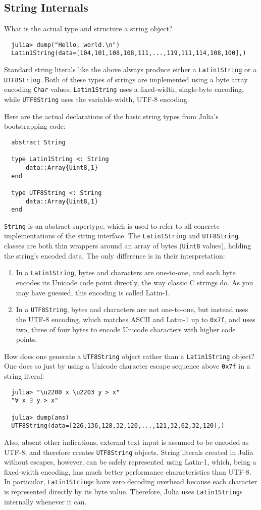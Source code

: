 \documentclass{article}
\begin{document}
\subsection{String Internals}

What is the actual type and structure a string object?
\begin{verbatim}
  julia> dump("Hello, world.\n")
  Latin1String(data=[104,101,108,108,111,...,119,111,114,108,100],)
\end{verbatim}
Standard string literals like the above always produce either a \verb|Latin1String| or a \verb|UTF8String|.
Both of these types of strings are implemented using a byte array encoding \verb|Char| values.
\verb|Latin1String| uses a fixed-width, single-byte encoding, while \verb|UTF8String| uses the variable-width, UTF-8 encoding.

Here are the actual declarations of the basic string types from Julia's bootstrapping code:
\begin{verbatim}
  abstract String

  type Latin1String <: String
      data::Array{Uint8,1}
  end

  type UTF8String <: String
      data::Array{Uint8,1}
  end
\end{verbatim}
\verb|String| is an abstract supertype, which is used to refer to all concrete implementations of the string interface.
The \verb|Latin1String| and \verb|UTF8String| classes are both thin wrappers around an array of bytes (\verb|Uint8| values), holding the string's encoded data.
The only difference is in their interpretation:
\begin{enumerate}
\item In a \verb|Latin1String|, bytes and characters are one-to-one, and each byte encodes its Unicode code point directly, the way classic C strings do.
As you may have guessed, this encoding is called Latin-1.
\item In a \verb|UTF8String|, bytes and characters are not one-to-one, but instead uses the UTF-8 encoding, which matches ASCII and Latin-1 up to \verb|0x7f|, and uses two, three of four bytes to encode Unicode characters with higher code points.
\end{enumerate}
How does one generate a \verb|UTF8String| object rather than a \verb|Latin1String| object?
One does so just by using a Unicode character escape sequence above \verb|0x7f| in a string literal:
\begin{verbatim}
  julia> "\u2200 x \u2203 y > x"
  "∀ x ∃ y > x"

  julia> dump(ans)
  UTF8String(data=[226,136,128,32,120,...,121,32,62,32,120],)
\end{verbatim}
Also, absent other indications, external text input is assumed to be encoded as UTF-8, and therefore creates \verb|UTF8String| objects.
String literals created in Julia without escapes, however, can be safely represented using Latin-1, which, being a fixed-width encoding, has much better performance characteristics than UTF-8.
In particular, \verb|Latin1String|s have zero decoding overhead because each character is represented directly by its byte value.
Therefore, Julia uses \verb|Latin1String|s internally whenever it can.
\end{document}
